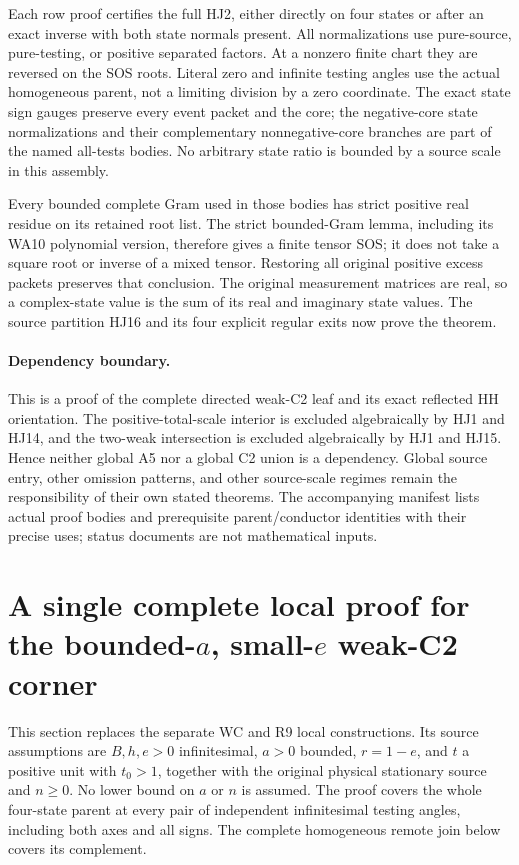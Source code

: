 Each row proof certifies the full HJ2, either directly
on four states or after an exact inverse with both
state normals present.
All normalizations use pure-source, pure-testing,
or positive separated factors.
At a nonzero finite chart they are reversed on
the SOS roots.  Literal zero and infinite testing
angles use the actual homogeneous parent, not a
limiting division by a zero coordinate.
The exact state sign gauges preserve every event
packet and the core; the negative-core state
normalizations and their complementary
nonnegative-core branches are part of the named
all-tests bodies.
No arbitrary state ratio is bounded by a source
scale in this assembly.

Every bounded complete Gram used in those bodies
has strict positive real residue on its retained
root list.  The strict bounded-Gram lemma, including
its WA10 polynomial version, therefore
gives a finite tensor SOS; it does not take a
square root or inverse of a mixed tensor.
Restoring all original positive excess packets
preserves that conclusion.
The original measurement matrices are real, so a
complex-state value is the sum of its real and
imaginary state values.
The source partition HJ16 and its four explicit
regular exits now prove the theorem.

\paragraph{Dependency boundary.}
This is a proof of the complete directed weak-C2
leaf and its exact reflected HH orientation.
The positive-total-scale interior is excluded
algebraically by HJ1 and HJ14, and the two-weak
intersection is excluded algebraically by HJ1
and HJ15.  Hence neither global A5 nor a global
C2 union is a dependency.
Global source entry, other omission patterns,
and other source-scale regimes remain the
responsibility of their own stated theorems.
The accompanying manifest lists actual proof
bodies and prerequisite parent/conductor
identities with their precise uses; status
documents are not mathematical inputs.


\section{\texorpdfstring{A single complete local proof for the bounded-$a$, small-$e$ weak-C2 corner}{A single complete local proof for the bounded-a, small-e weak-C2 corner}}
\label{sec:new-bounded-a-weak-c2}

This section replaces the separate WC and R9 local constructions. Its
source assumptions are $B,h,e>0$ infinitesimal, $a>0$ bounded,
$r=1-e$, and $t$ a positive unit with $t_0>1$, together with the
original physical stationary source and $n\ge0$. No lower bound on
$a$ or $n$ is assumed. The proof covers the whole four-state parent
at every pair of independent infinitesimal testing angles, including
both axes and all signs. The complete homogeneous remote join below
covers its complement.

